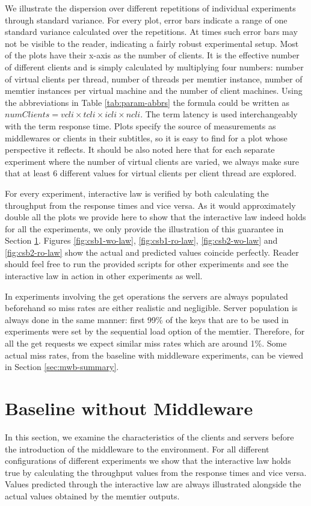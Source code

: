 \documentclass[11pt,a4paper]{article}
\begin{document}
\par We illustrate the dispersion over different repetitions of individual experiments through standard variance. For every plot, error bars indicate a range of one standard variance calculated over the repetitions. At times such error bars may not be visible to the reader, indicating a fairly robust experimental setup. Most of the plots have their x-axis as the number of clients. It is the effective number of different clients and is simply calculated by multiplying four numbers: number of virtual clients per thread, number of threads per memtier instance, number of memtier instances per virtual machine and the number of client machines. Using the abbreviations in Table \ref{tab:param-abbrs} the formula could be written as $numClients = vcli \times tcli \times icli \times ncli$. The term latency is used interchangeably with the term response time. Plots specify the source of measurements as middlewares or clients in their subtitles, so it is easy to find for a plot whose perspective it reflects. It should be also noted here that for each separate experiment where the number of virtual clients are varied, we always make sure that at least 6 different values for virtual clients per client thread are explored.
\par For every experiment, interactive law is verified by both calculating the throughput from the response times and vice versa. As it would approximately double all the plots we provide here to show that the interactive law indeed holds for all the experiments, we only provide the illustration of this guarantee in Section \ref{sec:csb}. Figures \ref{fig:csb1-wo-law}, \ref{fig:csb1-ro-law}, \ref{fig:csb2-wo-law} and \ref{fig:csb2-ro-law} show the actual and predicted values coincide perfectly. Reader should feel free to run the provided scripts for other experiments and see the interactive law in action in other experiments as well.
\\
\par In  experiments involving the get operations the servers are always populated beforehand so miss rates are either realistic and negligible. Server population is always done in the same manner: first 99\% of the keys that are to be used in experiments were set by the sequential load option of the memtier. Therefore, for all the get requests we expect similar miss rates which are around 1\%. Some actual miss rates, from the baseline with middleware experiments, can be viewed in Section \ref{sec:mwb-summary}.


\section{Baseline without Middleware} \label{sec:csb}
In this section, we examine the characteristics of the clients and servers before the introduction of the middleware to the environment. For all different configurations of different experiments we show that the interactive law holds true by calculating the throughput values from the response times and vice versa. Values predicted through the interactive law are always illustrated alongside the actual values obtained by the memtier outputs.
\end{document}
